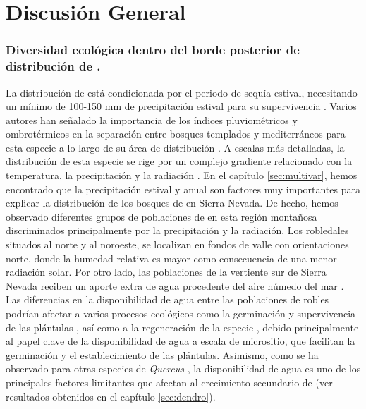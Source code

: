 %
\chapter*{\textcolor{ctcolormain}{Discusión General}}\label{sec:discussions}
\newpage

\subsection*{Diversidad ecológica dentro del borde posterior de distribución de \Qp. }\label{sec:discussions:diversidad}

La distribución de \Qp está condicionada por el periodo de sequía estival, necesitando un mínimo de 100-150 mm de precipitación estival para su supervivencia \autocite{BlancoCastroetal2005BosquesIbericos,GarciaJimenez20099230Robledales}. Varios autores han señalado la importancia de los índices pluviométricos y ombrotérmicos en la separación entre bosques templados y mediterráneos para esta especie a lo largo de su área de distribución \autocite{delRioetal2007BioclimaticAnalysis}. A escalas más detalladas, la distribución de esta especie se rige por un complejo gradiente relacionado con la temperatura, la precipitación y la radiación \autocites{Gavilanetal2007ModellingCurrent,Urbietaetal2011MediterraneanPine}. En el capítulo \ref{sec:multivar}, hemos encontrado que la precipitación estival y anual son factores muy importantes para explicar la distribución de los bosques de \Qp en Sierra Nevada. De hecho, hemos observado diferentes grupos de poblaciones de \Qp en esta región montañosa discriminados principalmente por la precipitación y la radiación. Los robledales situados al norte y al noroeste, se localizan en fondos de valle con orientaciones norte, donde la humedad relativa es mayor como consecuencia de una menor radiación solar. Por otro lado, las poblaciones de la vertiente sur de Sierra Nevada reciben un aporte extra de agua procedente del aire húmedo del mar \autocite{MartinezParrasMoleroMesa1982EcologiaFitosociologia}. Las diferencias en la disponibilidad de agua entre las poblaciones de robles podrían afectar a varios procesos ecológicos como la germinación y supervivencia de las plántulas \autocites{Gomez2003ImpactVertebrate, GomezAparicioetal2008OakSeedling,Mendozaetal2009SeedingExperiment}, así como a la regeneración de la especie \autocites{Gomezetal2001ProblemasRegeneracion}, debido principalmente al papel clave de la disponibilidad de agua a escala de micrositio, que facilitan la germinación y el establecimiento de las plántulas. Asimismo, como se ha observado para otras especies de \emph{Quercus} \autocites[\emph{e.g.}][]{Tessieretal1994DeciduousQuercus,DiFilippoetal2010ClimateChange,GeaIzquierdoetal2011TreeringsReflect,GarciaGonzalezSoutoHerrero2017EarlywoodVessel}, la disponibilidad de agua es uno de los principales factores limitantes que afectan al crecimiento secundario de \Qp (ver resultados obtenidos en el capítulo \ref{sec:dendro}). 

